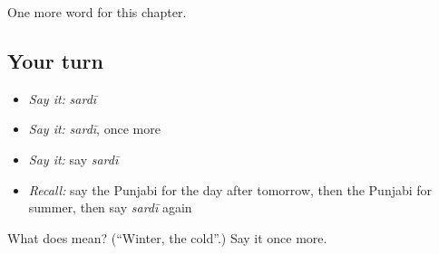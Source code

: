 \begin{grammarlens}[title={What you've built}]
One more word for this chapter.
\end{grammarlens}

\subsection*{Your turn}
\begin{itemize}
\raggedright
  \item \emph{Say it:} \emph{sardī}
  \item \emph{Say it:} \emph{sardī}, once more
  \item \emph{Say it:} say \emph{sardī}
  \item \emph{Recall:} say the Punjabi for the day after tomorrow, then the Punjabi for summer, then say \emph{sardī} again
\end{itemize}

\begin{tcolorbox}[breakable,colback=teal!4,colframe=teal!35!black,title={Before you move on}]
What does  mean? (\textquotedblleft{}Winter, the cold\textquotedblright{}.) Say it once more.
\end{tcolorbox}
